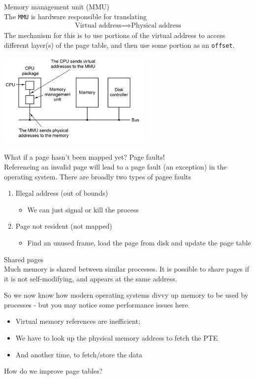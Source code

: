 \documentclass[journal, letterpaper]{IEEEtran}
\begin{document}
\begin{theory}{Memory management unit (MMU)} \\
    The \verb|MMU| is hardware responsible for translating
    \begin{gather*}
        \text{Virtual address} \implies \text{Physical address}
    \end{gather*}
    The mechanism for this is to use portions of the virtual address to access different layer(s) of the page table, and then use some portion as an \verb|offset|.
    \begin{center}
        \includegraphics[width=7.5cm]{./photos/tlb.png}
    \end{center}
\end{theory}
\begin{example}{What if a page hasn't been mapped yet? Page faults!}  \\
    Referencing an invalid page will lead to a page fault (an exception) in the operating system. There are broadly two types of pagee faults
    \begin{enumerate}
        \item Illegal address (out of bounds)
        \begin{itemize}
            \item We can just signal or kill the process 
        \end{itemize}
        \item Page not resident (not mapped)
        \begin{itemize}
            \item Find an unused frame, load the page from disk and update the page table
        \end{itemize}
    \end{enumerate}
\end{example}
\begin{aside}{Shared pages} \\
    Much memory is shared between similar processes. It is possible to share pages if it is not self-modifying, and appears at the same address.
\end{aside}
So we now know how modern operating systems divvy up memory to be used by processes - but you may notice some performance issues here.
\begin{itemize}
    \item Virtual memory references are inefficient;
    \item We have to look up the physical memory address to fetch the PTE
    \item And another time, to fetch/store the data
\end{itemize}
How do we improve page tables?
\end{document}
